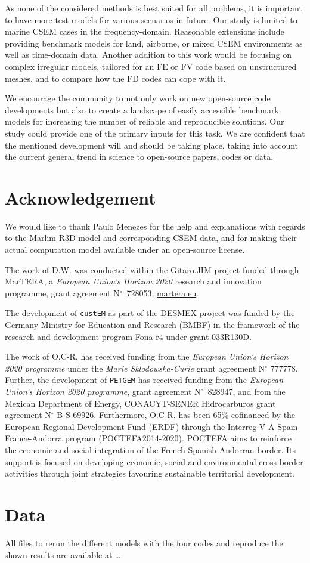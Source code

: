 \documentclass[
    paper,
  ]{geophysics}
\newcommand{\custem}{\texttt{custEM}\xspace}
\newcommand{\petgem}{\texttt{PETGEM}\xspace}
\newcommand{\itodo}[1]{\todo[inline]{\sffamily #1}}
\begin{document}
As none of the considered methods is best suited for all problems, it is important to have more test models for various scenarios in future. Our study is limited to marine CSEM cases in the frequency-domain. Reasonable extensions include providing benchmark models for land, airborne, or mixed CSEM environments as well as time-domain data. Another addition to this work would be focusing on complex irregular  models, tailored for an FE or FV code based on unstructured meshes, and to compare how the FD codes can cope with it.

We encourage the community to not only work on new open-source code developments but also to create a landscape of easily accessible benchmark models for increasing the number of reliable and reproducible solutions. Our study could provide one of the primary inputs for this task. We are confident that the mentioned development will and should be taking place, taking into account the current general trend in science to open-source papers, codes or data.




\section{Acknowledgement}

We would like to thank Paulo Menezes for the help and explanations with regards to the Marlim R3D model and corresponding CSEM data, and for making their actual computation model available under an open-source license.

The work of D.W. was conducted within the Gitaro.JIM project funded through MarTERA, a \emph{European Union's Horizon 2020} research and innovation programme, grant agreement N$^\circ$~728053; \href{https://www.martera.eu}{martera.eu}.

The development of \custem as part of the DESMEX project was funded by the Germany Ministry for Education and Research (BMBF) in the framework of the research and development program Fona-r4 under grant 033R130D.

The work of O.C-R. has received funding from the \emph{European Union's Horizon 2020 programme} under the \emph{Marie Sklodowska-Curie} grant agreement N$^\circ$ 777778. Further, the development of \petgem has received funding from the \emph{European Union's Horizon 2020 programme}, grant agreement N$^\circ$~828947, and from the Mexican Department of Energy, CONACYT-SENER Hidrocarburos grant agreement N$^\circ$ B-S-69926. Furthermore, O.C-R. has been 65\% cofinanced by the European Regional Development Fund (ERDF) through the Interreg V-A Spain-France-Andorra program (POCTEFA2014-2020). POCTEFA aims to reinforce the economic and social integration of the French-Spanish-Andorran border. Its support is focused on developing economic, social and environmental cross-border activities through joint strategies favouring sustainable territorial development.


\section{Data}

All files to rerun the different models with the four codes and reproduce the shown results are available at \dots.
\itodo{Put up on Zenodo, link here.}



\end{document}
